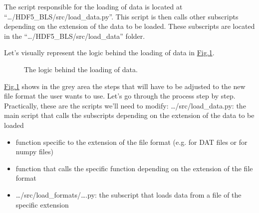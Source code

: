 \documentclass[letterpaper,10pt,english]{sphinxmanual}
\begin{document}
\sphinxAtStartPar
The script responsible for the loading of data is located at “…/HDF5\_BLS/src/load\_data.py”. This script is then calls other sub\sphinxhyphen{}scripts depending on the extension of the data to be loaded. These sub\sphinxhyphen{}scripts are located in the “…/HDF5\_BLS/src/load\_data” folder.

\sphinxAtStartPar
Let’s visually represent the logic behind the loading of data in \hyperref[\detokenize{source/developer/add_file_format:logic-adding-data}]{Fig.\@ \ref{\detokenize{source/developer/add_file_format:logic-adding-data}}}.

\begin{figure}[htbp]
\centering
\capstart

\noindent{}
\caption{The logic behind the loading of data.}\label{\detokenize{source/developer/add_file_format:id1}}\label{\detokenize{source/developer/add_file_format:logic-adding-data}}\end{figure}

\sphinxAtStartPar
\hyperref[\detokenize{source/developer/add_file_format:logic-adding-data}]{Fig.\@ \ref{\detokenize{source/developer/add_file_format:logic-adding-data}}} shows in the grey area the steps that will have to be adjusted to the new file format the user wants to use. Let’s go through the process step by step. Practically, these are the scripts we’ll need to modify:
\sphinxhyphen{} …/src/load\_data.py: the main script that calls the sub\sphinxhyphen{}scripts depending on the extension of the data to be loaded
\begin{itemize}
\item {} 
\sphinxAtStartPar
function specific to the extension of the file format (e.g.  for DAT files or  for numpy files)

\item {} 
\sphinxAtStartPar
{} function that calls the specific function depending on the extension of the file format

\end{itemize}
\begin{itemize}
\item {} 
\sphinxAtStartPar
…/src/load\_formats/….py: the sub\sphinxhyphen{}script that loads data from a file of the specific extension

\end{itemize}
\end{document}
